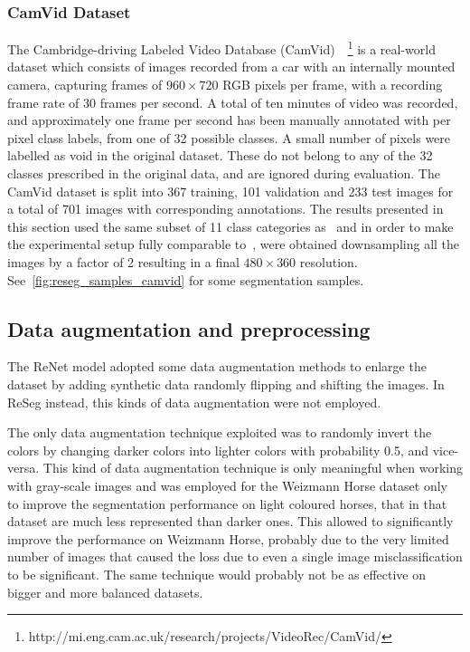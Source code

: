\subsubsection{CamVid Dataset}\label{sec:reseg+camvid}
The Cambridge-driving Labeled Video Database (CamVid)~\cite{
Brostow2010semantic}~\footnote{%
http://mi.eng.cam.ac.uk/research/projects/VideoRec/CamVid/}
is a real-world dataset which consists of images recorded from a car with an
internally mounted camera, capturing frames of $960 \times 720$ RGB pixels per
frame, with a recording frame rate of 30 frames per second.  A total of ten
minutes of video was recorded, and approximately one frame per second has been
manually annotated with per pixel class labels, from one of 32 possible
classes. A small number of pixels were labelled as void in the original
dataset. These do not belong to any of the 32 classes prescribed in the
original data, and are ignored during evaluation. The CamVid dataset is split
into 367 training, 101 validation and 233 test images for a total of 701 images
with corresponding annotations. The results presented in this section used the
same subset of 11 class categories as~\cite{badrinarayanan2015segnet} and in
order to make the experimental setup fully comparable to~\cite{
badrinarayanan2015segnet}, were obtained downsampling all the images by a
factor of 2 resulting in a final $480 \times 360$ resolution.
See~\autoref{fig:reseg_samples_camvid} for some segmentation samples.

\subsection{Data augmentation and preprocessing}\label{sec:data_preprocessing}

The ReNet model adopted some data augmentation methods to enlarge the dataset
by adding synthetic data randomly flipping and shifting the images. In ReSeg
instead, this kinds of data augmentation were not employed.

The only data augmentation technique exploited was to randomly invert the
colors by changing darker colors into lighter colors with probability 0.5, and
vice-versa. This kind of data augmentation technique is only meaningful when
working with gray-scale images and was employed for the Weizmann Horse dataset
only to improve the segmentation performance on light coloured horses, that in
that dataset are much less represented than darker ones. This allowed to
significantly improve the performance on Weizmann Horse, probably due to the
very limited number of images that caused the loss due to even a single image
misclassification to be significant. The same technique would probably not be
as effective on bigger and more balanced datasets.

